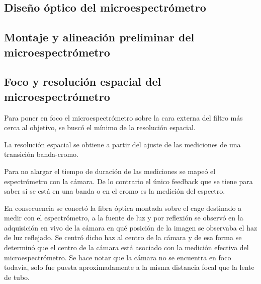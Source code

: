
\singlespacing
\subsection{Diseño óptico del microespectrómetro}
\label{sec:disop}


\singlespacing
\subsection{Montaje y alineación preliminar del microespectrómetro}
\label{sec:montalin}


\singlespacing
\subsection{Foco y resolución espacial del microespectrómetro}
\label{sec:focoresol}

\hspace{0.5cm}Para poner en foco el microespectrómetro sobre la cara externa del filtro más cerca al objetivo, se buscó el mínimo de la resolución espacial.

La resolución espacial se obtiene a partir del ajuste de las mediciones de una transición banda-cromo.

Para no alargar el tiempo de duración de las mediciones se mapeó el espectrómetro con la cámara. De lo contrario el único feedback que se tiene para saber si se está en una banda o en el cromo es la medición del espectro.

En consecuencia se conectó la fibra óptica montada sobre el cage destinado a medir con el espectrómetro, a la fuente de luz y por reflexión se observó en la adquisición en vivo de la cámara en qué posición de la imagen se observaba el haz de luz reflejado. Se centró dicho haz al centro de la cámara y de esa forma se determinó que el centro de la cámara está asociado con la medición efectiva del microespectrómetro. Se hace notar que la cámara no se encuentra en foco todavía, solo fue puesta aproximadamente a la misma distancia focal que la lente de tubo.

